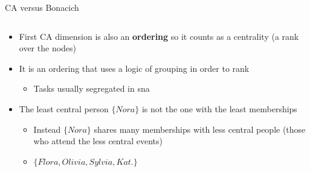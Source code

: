 \documentclass[
  ignorenonframetext,
]{beamer}
\providecommand{\tightlist}{%
  \setlength{\itemsep}{0pt}\setlength{\parskip}{0pt}}\usepackage{longtable,booktabs,array}
\begin{document}
\begin{frame}{CA versus Bonacich}
\begin{columns}[T]
\begin{column}{0.5\textwidth}
\begin{itemize}
\tightlist
\item
  First CA dimension is also an \textbf{ordering} so it counts as a
  centrality (a rank over the nodes)
\item
  It is an ordering that uses a logic of grouping in order to rank

  \begin{itemize}
  \tightlist
  \item
    Tasks usually segregated in sna
  \end{itemize}
\item
  The least central person \(\{Nora\}\) is not the one with the least
  memberships

  \begin{itemize}
  \tightlist
  \item
    Instead \(\{Nora\}\) shares many memberships with less central
    people (those who attend the less central events)
  \item
    \(\{Flora, Olivia, Sylvia, Kat.\}\)
  \end{itemize}
\end{itemize}
\end{column}
\end{columns}
\end{frame}
\end{document}
